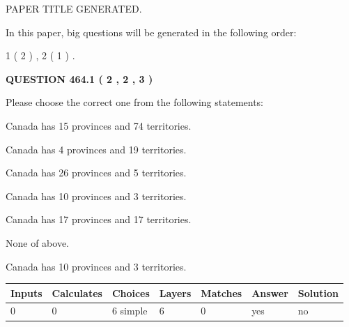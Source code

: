 \documentclass[12pt]{article}
\begin{document}
   
\vspace{0.2in}
   
   
   
   
   
   
   
   
 \vspace{0.2in}
 
 
 
 
   
   
 PAPER TITLE GENERATED.
   
   
   
\vspace{0.2in}
   
In this paper, big questions will be generated in the following order: 
   
   
   1 ( 2 )
 ,
   2 ( 1 )
 .
  
\vspace{0.2in}
  
{\textbf{\Large{QUESTION
464.1 
 ( 2 , 2 , 3 )
}}}
  
  
Please choose the correct one from the following statements:
 
 
Canada has  15 provinces and  74 territories.
 
 
Canada has   4 provinces and  19 territories.
 
 
Canada has  26 provinces and  5 territories.
 
 
Canada has 10  provinces and 3 territories.
 
 
Canada has  17 provinces and  17 territories.
 
 
 None of above.
 
 
\noindent{}
 
 
Canada has 10  provinces and 3 territories.
 
 
\noindent{}
 
 
   
   
   
   
\noindent\begin{tabular}{|l|l|l|l|l|l|l|}
 \hline
Inputs & Calculates & Choices & Layers & Matches & Answer & Solution \\ \hline
 0  & 
 0  & 
 6
  simple  
  & 
 6  & 
 0  & 
  yes & 
  no 
  \\ \hline
 \end{tabular}
   
\end{document}
